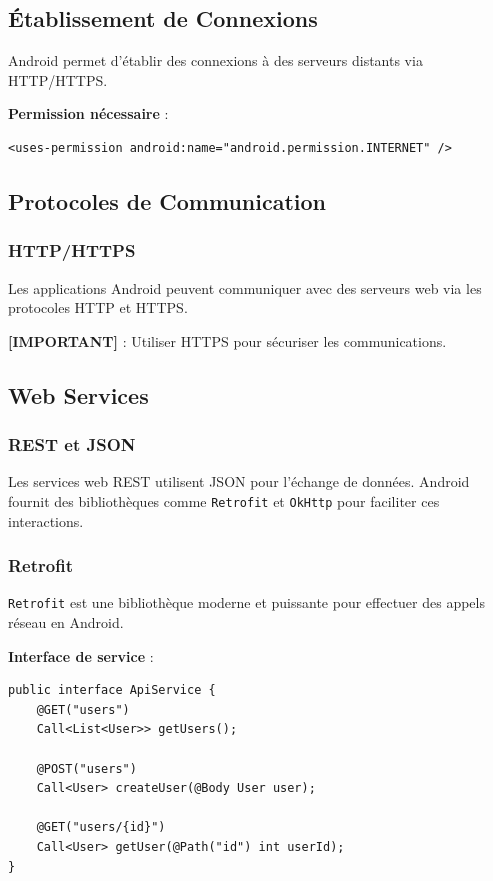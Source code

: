 \documentclass[11pt,a4paper]{article}
\begin{document}
\subsection{Établissement de Connexions}

Android permet d'établir des connexions à des serveurs distants via HTTP/HTTPS.

\textbf{Permission nécessaire} :
\begin{lstlisting}[style=XML]
<uses-permission android:name="android.permission.INTERNET" />
\end{lstlisting}

\subsection{Protocoles de Communication}

\subsubsection{HTTP/HTTPS}

Les applications Android peuvent communiquer avec des serveurs web via les protocoles HTTP et HTTPS.

\textbf{[IMPORTANT]} : Utiliser HTTPS pour sécuriser les communications.

\subsection{Web Services}

\subsubsection{REST et JSON}

Les services web REST utilisent JSON pour l'échange de données. Android fournit des bibliothèques comme \texttt{Retrofit} et \texttt{OkHttp} pour faciliter ces interactions.

\subsubsection{Retrofit}

\texttt{Retrofit} est une bibliothèque moderne et puissante pour effectuer des appels réseau en Android.

\textbf{Interface de service} :
\begin{lstlisting}
public interface ApiService {
    @GET("users")
    Call<List<User>> getUsers();
    
    @POST("users")
    Call<User> createUser(@Body User user);
    
    @GET("users/{id}")
    Call<User> getUser(@Path("id") int userId);
}
\end{lstlisting}
\end{document}
